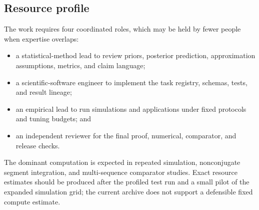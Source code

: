 \subsection{Resource profile}

The work requires four coordinated roles, which may be held by fewer people when expertise overlaps:
\begin{itemize}
  \item a statistical-method lead to review priors, posterior prediction, approximation assumptions, metrics, and claim language;
  \item a scientific-software engineer to implement the task registry, schemas, tests, and result lineage;
  \item an empirical lead to run simulations and applications under fixed protocols and tuning budgets; and
  \item an independent reviewer for the final proof, numerical, comparator, and release checks.
\end{itemize}

The dominant computation is expected in repeated simulation, nonconjugate segment integration, and multi-sequence comparator studies. Exact resource estimates should be produced after the profiled test run and a small pilot of the expanded simulation grid; the current archive does not support a defensible fixed compute estimate.

